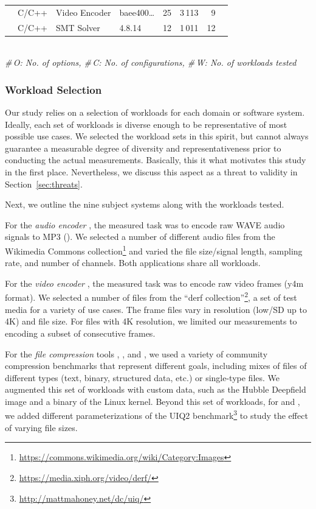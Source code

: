 {{\begin{table}
\begin{tabular}{p{1.1cm}p{0.6cm}p{1.9cm}p{0.99cm}p{0.2cm}rrr}
	\xzwo & C/C++ & Video Encoder & baee400\ldots & 25 & 3\,113 & 9  \\
	\zdrei & C/C++ & SMT Solver & 4.8.14 & 12 & 1\,011 & 12  \\
	
	\bottomrule
	
\end{tabular}\\
{\centering\vspace{1mm}\textit{\#\,O: No. of options, \#\,C: No. of configurations, \#\,W: No. of workloads tested}}
	

	\label{tab:subject_systems}
\end{table}

\subsubsection{Workload Selection}
Our study relies on a selection of workloads for each domain or software system. Ideally, each set of workloads is diverse enough to be representative of most possible use cases. We selected the workload sets in this spirit, but cannot always guarantee a measurable degree of diversity and representativeness prior to conducting the actual measurements. Basically, this it what motivates this study in the first place. Nevertheless, we discuss this aspect as a threat to validity in Section~\ref{sec:threats}. 

Next, we outline the nine subject systems along with the workloads tested. 

For the \textit{audio encoder} \jumper, the measured task was to encode raw WAVE audio signals to MP3 (\jumper). We selected a number of different audio files from the Wikimedia Commons collection\footnote{\url{https://commons.wikimedia.org/wiki/Category:Images}} and  varied the file size/signal length, sampling rate, and number of channels. Both applications share all workloads.

For the \textit{video encoder} \xzwo, the measured task was to encode raw video frames (y4m format). We selected a number of files from the “derf collection”\footnote{\url{https://media.xiph.org/video/derf/}}, a set of test media for a variety of use cases. The frame files vary in resolution (low/SD up to 4K) and file size. For files with 4K resolution, we limited our measurements to encoding a subset of consecutive frames.

For the \textit{file compression} tools \kanzi, \xz, and \lrzip, we used a variety of community compression benchmarks that represent different goals, including mixes of files of different types (text, binary, structured data, etc.) or single-type files. We augmented this set of workloads with custom data, such as the Hubble Deepfield image and a binary of the Linux kernel. Beyond this set of workloads, for \xz and \lrzip, we added different parameterizations of the UIQ2 benchmark\footnote{\url{http://mattmahoney.net/dc/uiq/}} to study the effect of varying file sizes. 

}}
